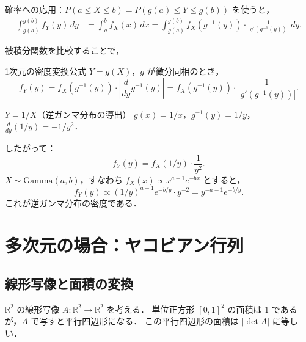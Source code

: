 \documentclass[lualatex,ja=standard,a4paper,12pt]{bxjsarticle}
\begin{document}
確率への応用：$P(a \leq X \leq b) = P(g(a) \leq Y \leq g(b))$ を使うと，
\begin{align*}
  \int_{g(a)}^{g(b)} f_Y(y)\,dy
  &= \int_a^b f_X(x)\,dx
   = \int_{g(a)}^{g(b)} f_X(g^{-1}(y)) \cdot \frac{1}{|g'(g^{-1}(y))|}\,dy.
\end{align*}

被積分関数を比較することで，

\begin{thmbox}{1次元の密度変換公式}
$Y = g(X)$，$g$ が微分同相のとき，
\[
  f_Y(y) = f_X(g^{-1}(y)) \cdot \left|\frac{d}{dy}g^{-1}(y)\right|
          = f_X(g^{-1}(y)) \cdot \frac{1}{|g'(g^{-1}(y))|}.
\]
\end{thmbox}

\begin{exbox}{$Y = 1/X$（逆ガンマ分布の導出）}
$g(x) = 1/x$，$g^{-1}(y) = 1/y$，$\frac{d}{dy}(1/y) = -1/y^2$．

したがって：
\[
  f_Y(y) = f_X(1/y) \cdot \frac{1}{y^2}.
\]
$X \sim \mathrm{Gamma}(a, b)$，すなわち $f_X(x) \propto x^{a-1}e^{-bx}$ とすると，
\[
  f_Y(y) \propto (1/y)^{a-1} e^{-b/y} \cdot y^{-2} = y^{-a-1} e^{-b/y}.
\]
これが逆ガンマ分布の密度である．
\end{exbox}

\section{多次元の場合：ヤコビアン行列}

\subsection{線形写像と面積の変換}

$\mathbb{R}^2$ の線形写像 $A : \mathbb{R}^2 \to \mathbb{R}^2$ を考える．
単位正方形 $[0,1]^2$ の面積は $1$ であるが，$A$ で写すと平行四辺形になる．
この平行四辺形の面積は $|\det A|$ に等しい．

\begin{center}
\end{center}
\end{document}
